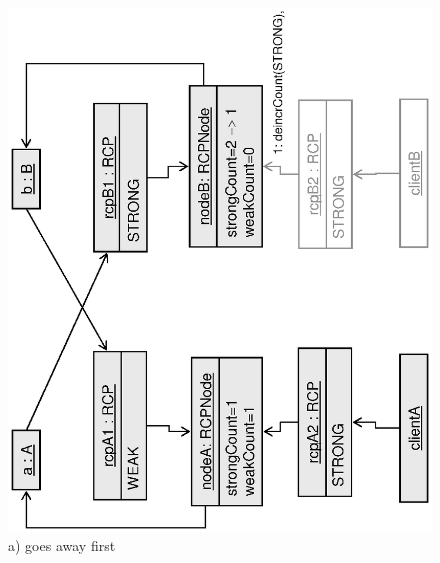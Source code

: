 \documentclass[pdf,ps2pdf,11pt]{SANDreport}
\begin{document}
{\bsinglespace
\begin{figure}
\begin{center}
\includegraphics*[angle=270,scale=0.65]{CircularRCP_A_B_ClientB_1}
\\[2ex] a) {} goes away first \\[3ex]

\end{center}
\end{figure}}
\end{document}
